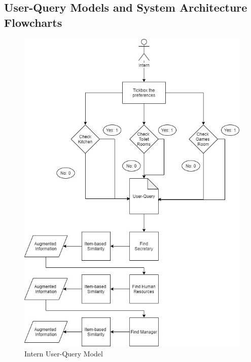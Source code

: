 \documentclass{aifyp}
\begin{document}
\newpage
% 
\nocite{youtube}


\newpage
\begin{appendices}
\section{User-Query Models and System Architecture Flowcharts}
    \begin{figure}[H]
    \centering
    \includegraphics[scale=0.4]{Images/Chapter4/InternQuery.jpg}
    \caption[Inter User-Query Model]{Intern User-Query Model}
    \label{fig:InternQueryModel}
\end{figure}
\begin{figure}[H]

\end{figure}
\end{appendices}
\end{document}

